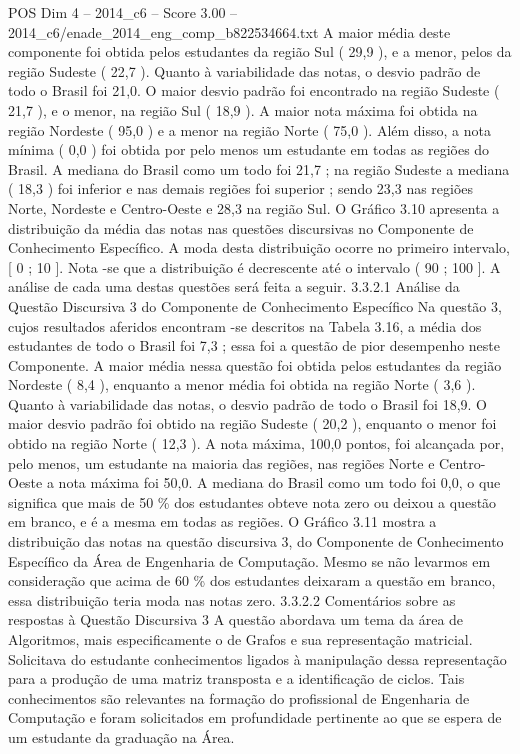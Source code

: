 \begin{textsample}{POS Dim 4 – 2014\_c6 – Score 3.00 – 2014\_c6/enade\_2014\_eng\_comp\_b822534664.txt}
A maior média deste componente foi obtida pelos estudantes da região Sul ( 29,9 ), e a menor, pelos da região Sudeste ( 22,7 ).
Quanto à variabilidade das notas, o desvio padrão de todo o Brasil foi 21,0.
O maior desvio padrão foi encontrado na região Sudeste ( 21,7 ), e o menor, na região Sul ( 18,9 ).
A maior nota máxima foi obtida na região Nordeste ( 95,0 ) e a menor na região Norte ( 75,0 ).
Além disso, a nota mínima ( 0,0 ) foi obtida por pelo menos um estudante em todas as regiões do Brasil.
A mediana do Brasil como um todo foi 21,7 ; na região Sudeste a mediana ( 18,3 ) foi inferior e nas demais regiões foi superior ; sendo 23,3 nas regiões Norte, Nordeste e Centro-Oeste e 28,3 na região Sul.
O Gráfico 3.10 apresenta a distribuição da média das notas nas questões discursivas no Componente de Conhecimento Específico.
A moda desta distribuição ocorre no primeiro intervalo, [ 0 ; 10 ].
Nota -se que a distribuição é decrescente até o intervalo ( 90 ; 100 ].
A análise de cada uma destas questões será feita a seguir. 3.3.2.1 Análise da Questão Discursiva 3 do Componente de Conhecimento Específico Na questão 3, cujos resultados aferidos encontram -se descritos na Tabela 3.16, a média dos estudantes de todo o Brasil foi 7,3 ; essa foi a questão de pior desempenho neste Componente.
A maior média nessa questão foi obtida pelos estudantes da região Nordeste ( 8,4 ), enquanto a menor média foi obtida na região Norte ( 3,6 ).
Quanto à variabilidade das notas, o desvio padrão de todo o Brasil foi 18,9.
O maior desvio padrão foi obtido na região Sudeste ( 20,2 ), enquanto o menor foi obtido na região Norte ( 12,3 ).
A nota máxima, 100,0 pontos, foi alcançada por, pelo menos, um estudante na maioria das regiões, nas regiões Norte e Centro-Oeste a nota máxima foi 50,0.
A mediana do Brasil como um todo foi 0,0, o que significa que mais de 50 \% dos estudantes obteve nota zero ou deixou a questão em branco, e é a mesma em todas as regiões.
O Gráfico 3.11 mostra a distribuição das notas na questão discursiva 3, do Componente de Conhecimento Específico da Área de Engenharia de Computação.
Mesmo se não levarmos em consideração que acima de 60 \% dos estudantes deixaram a questão em branco, essa distribuição teria moda nas notas zero. 3.3.2.2 Comentários sobre as respostas à Questão Discursiva 3 A questão abordava um tema da área de Algoritmos, mais especificamente o de Grafos e sua representação matricial.
Solicitava do estudante conhecimentos ligados à manipulação dessa representação para a produção de uma matriz transposta e a identificação de ciclos.
Tais conhecimentos são relevantes na formação do profissional de Engenharia de Computação e foram solicitados em profundidade pertinente ao que se espera de um estudante da graduação na Área.

\end{textsample}
